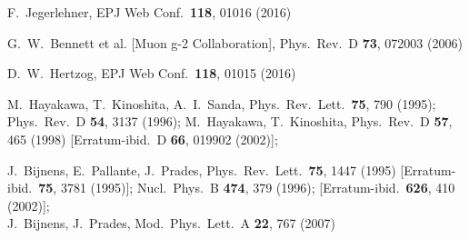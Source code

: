 \documentclass[epj,onecolumn]{webofc}
\begin{document}
\begin{thebibliography}{}
%
%
%
%
%
%

  F.~Jegerlehner,
  EPJ Web Conf.\  {\bf 118}, 01016 (2016)

G.~W.~Bennett et al.  [Muon g-2 Collaboration],
Phys.\ Rev.\ D {\bf 73}, 072003 (2006)

  D.~W.~Hertzog,
  EPJ Web Conf.\  {\bf 118}, 01015 (2016)

M.~Hayakawa, T.~Kinoshita, A.~I.~Sanda,
Phys.\ Rev.\ Lett.\  {\bf 75}, 790 (1995);
Phys.\ Rev.\ D {\bf 54}, 3137 (1996);
M.~Hayakawa, T.~Kinoshita,
Phys.\ Rev.\ D {\bf 57}, 465 (1998)
[Erratum-ibid.\ D {\bf 66}, 019902 (2002)];

J.~Bijnens, E.~Pallante, J.~Prades,
Phys.\ Rev.\ Lett.\  {\bf 75}, 1447 (1995)
[Erratum-ibid.\  {\bf 75}, 3781 (1995)];
Nucl.\ Phys.\ B {\bf 474}, 379 (1996);
[Erratum-ibid.\ {\bf 626}, 410 (2002)];\\
J.~Bijnens, J.~Prades,
Mod.\ Phys.\ Lett.\  A {\bf 22}, 767 (2007)


\end{thebibliography}
\end{document}
